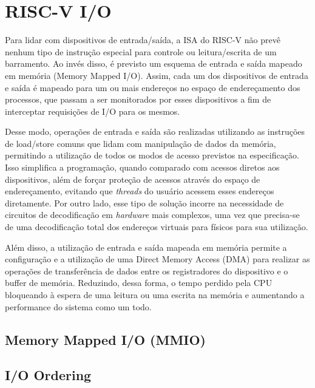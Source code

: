 
\section*{RISC-V I/O}

	Para lidar com dispositivos de entrada/saída, a ISA do RISC-V não prevê nenhum tipo
	de instrução especial para controle ou leitura/escrita de um barramento. Ao invés
	disso, é previsto um esquema de entrada e saída mapeado em memória (Memory Mapped I/O).
	Assim, cada um dos dispositivos de entrada e saída é mapeado para um ou mais endereços
	no espaço de endereçamento dos processos, que passam a ser monitorados por esses
	dispositivos a fim de interceptar requisições de I/O para os mesmos.

	Desse modo, operações de entrada e saída são realizadas utilizando as instruções de
	load/store comuns que lidam com manipulação de dados da memória, permitindo a utilização
	de todos os modos de acesso previstos na especificação. Isso simplifica a programação, quando
	comparado com acessos diretos aos dispositivos, além de forçar proteção de acessos
	através do espaço de endereçamento, evitando que \textit{threads} do usuário acessem esses
	endereços diretamente. Por outro lado, esse tipo de solução incorre na necessidade
	de circuitos de decodificação em \textit{hardware} mais complexos, uma vez que precisa-se
	de uma decodificação total dos endereços virtuais para físicos para sua utilização.

	Além disso, a utilização de entrada e saída mapeada em memória permite a configuração e a
	utilização de uma Direct Memory Access (DMA) para realizar as operações de transferência
	de dados entre os registradores do dispositivo e o buffer de memória. Reduzindo,
	dessa forma, o tempo perdido pela CPU bloqueando à espera de uma leitura ou uma escrita na
	memória e aumentando a performance do sistema como um todo.


	\subsection*{Memory Mapped I/O (MMIO)}


	\subsection*{I/O Ordering}

